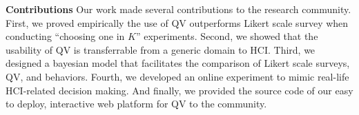 \textbf{Contributions}
Our work made several contributions to the research community. 
First, we proved empirically 
the use of QV outperforms Likert scale survey
when conducting ``choosing one in $K$'' experiments.
Second, we showed that the usability of QV
is transferrable from a generic domain to HCI.
Third, we designed a bayesian model 
that facilitates the comparison
of Likert scale surveys, QV, and behaviors.
Fourth, we developed an online experiment
to mimic real-life HCI-related decision making.
And finally, we provided the source code of our easy to deploy, 
interactive web platform for QV to the community.